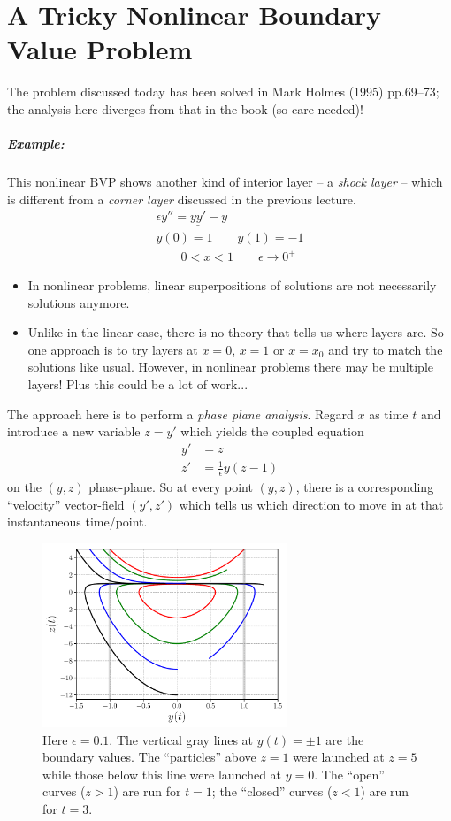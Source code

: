 \chapter[Nonlinear BVP]{A Tricky Nonlinear Boundary Value Problem}
The problem discussed today has been solved in Mark Holmes (1995) pp.69--73; the analysis here diverges from that in the book (so care needed)!

\paragraph{Example:} This \underline{nonlinear} BVP shows another kind of interior layer -- a \emph{shock layer} -- which is different from a \emph{corner layer} discussed in the previous lecture.
\begin{gather*}
	\epsilon y'' = \underline{yy'} - y\\
	y(0) = 1 \qquad y(1) = -1 \\
	\qquad 0 <x<1 \qquad \epsilon \rightarrow 0^+ 
\end{gather*}
\begin{itemize}
	\item In nonlinear problems, linear superpositions of solutions are not necessarily solutions anymore.
	\item Unlike in the linear case, there is no theory that tells us where layers are. So one approach is to try layers at $x=0$, $x=1$ or $x=x_0$ and try to match the solutions like usual. However, in nonlinear problems there may be multiple layers! Plus this could be a lot of work...
\end{itemize}
The approach here is to perform a \emph{phase plane analysis}. Regard $x$ as time $t$ and introduce a new variable $z=y'$ which yields the coupled equation
	\begin{align*}
	y' &= z \\
	z' &= \frac{1}{\epsilon} y(z-1)
	\end{align*}
on the $(y,z)$ phase-plane. So at every point $(y,z)$, there is a corresponding ``velocity'' vector-field $(y',z')$ which tells us which direction to move in at that instantaneous time/point.
\begin{figure}[!h]
	\centering
	\includegraphics[width=0.65\textwidth]{./plots/pdf/strogatz-wk16.pdf}
	\caption{Here $\epsilon=0.1$. The vertical gray lines at $y(t) =\pm 1$ are the boundary values. The ``particles'' above $z=1$ were launched at $z=5$ while those below this line were launched at $y=0$. The ``open'' curves ($z>1$) are run for $t=1$; the ``closed'' curves ($z<1$) are run for $t=3$.}
	\label{fig:strogatz-wk16}
\end{figure}
